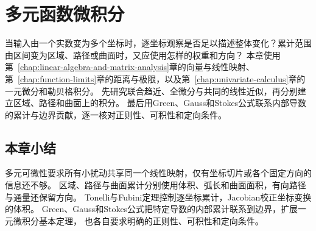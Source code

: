 \chapter{多元函数微积分}
\label{chap:multivariate-calculus}
\label{chap:multivariable-functions}

当输入由一个实数变为多个坐标时，逐坐标观察是否足以描述整体变化？累计范围由区间变为区域、路径或曲面时，又应使用怎样的权重和方向？
本章使用第~\ref{chap:linear-algebra-and-matrix-analysis}章的向量与线性映射、
第~\ref{chap:function-limits}章的距离与极限，以及第~\ref{chap:univariate-calculus}章的一元微分和勒贝格积分。
先研究联合趋近、全微分与共同的线性近似，再分别建立区域、路径和曲面上的积分。
最后用Green、Gauss和Stokes公式联系内部导数的累计与边界贡献，逐一核对正则性、可积性和定向条件。







\FloatBarrier
\section{本章小结}
\label{sec:multivariable-summary}

多元可微性要求所有小扰动共享同一个线性映射，仅有坐标切片或各个固定方向的信息还不够。
区域、路径与曲面累计分别使用体积、弧长和曲面面积，有向路径与通量还保留方向。
Tonelli与Fubini定理控制逐坐标累计，Jacobian校正坐标变换的体积。
Green、Gauss和Stokes公式把特定导数的内部累计联系到边界，扩展一元微积分基本定理，
也各自要求明确的正则性、可积性和定向条件。
